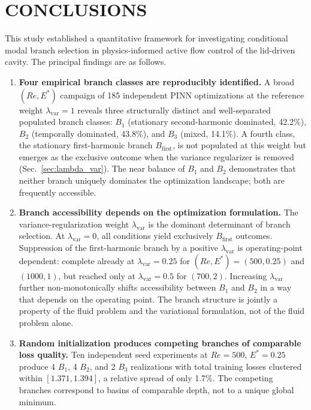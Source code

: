 \documentclass[a4paper,11pt]{article}
\begin{document}
\section{CONCLUSIONS}
\label{sec:conclusions}

This study established a quantitative framework for investigating conditional modal
branch selection in physics-informed active flow control of the lid-driven cavity.
The principal findings are as follows.

\begin{enumerate}
\item \textbf{Four empirical branch classes are reproducibly identified.}
A broad \((Re,E^*)\) campaign of 185 independent PINN optimizations at the
reference weight \(\lambda_{\mathrm{var}}=1\) reveals three structurally distinct and
well-separated populated branch classes: \(B_1\) (stationary
second-harmonic dominated, 42.2\%), \(B_2\) (temporally dominated, 43.8\%), and
\(B_3\) (mixed, 14.1\%). A fourth class, the stationary first-harmonic branch
\(B_{\mathrm{first}}\), is not populated at this weight but emerges as the exclusive
outcome when the variance regularizer is removed (Sec.~\ref{sec:lambda_var}). The
near balance of \(B_1\) and \(B_2\) demonstrates
that neither branch uniquely dominates the optimization landscape; both are
frequently accessible.

\item \textbf{Branch accessibility depends on the optimization formulation.}
The variance-regularization weight \(\lambda_{\mathrm{var}}\) is the dominant
determinant of branch selection. At \(\lambda_{\mathrm{var}}=0\), all conditions
yield exclusively \(B_{\mathrm{first}}\) outcomes. Suppression of the first-harmonic
branch by a positive \(\lambda_{\mathrm{var}}\) is operating-point dependent: complete
already at \(\lambda_{\mathrm{var}}=0.25\) for \((Re,E^*)=(500,0.25)\) and
\((1000,1)\), but reached only at \(\lambda_{\mathrm{var}}=0.5\) for \((700,2)\).
Increasing \(\lambda_{\mathrm{var}}\) further non-monotonically shifts accessibility
between \(B_1\) and \(B_2\) in a way that depends on the operating point. The branch
structure is jointly a property of
the fluid problem and the variational formulation, not of the fluid problem alone.

\item \textbf{Random initialization produces competing branches of comparable
loss quality.}
Ten independent seed experiments at \(Re=500\), \(E^*=0.25\) produce 4 \(B_1\),
4 \(B_2\), and 2 \(B_3\) realizations with total training losses clustered within
\([1.371,1.394]\), a relative spread of only 1.7\%. The competing branches
correspond to basins of comparable depth, not to a unique global minimum.


\end{enumerate}
\end{document}

